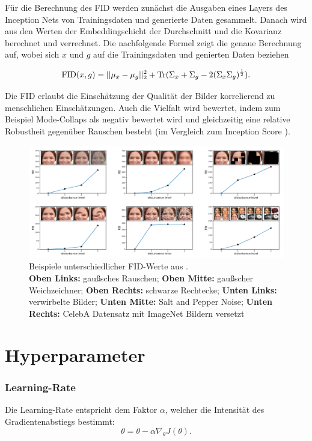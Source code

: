 Für die Berechnung des \acrshort{FID} werden zunächst die Ausgaben eines Layers des Inception Nets von Trainingsdaten und generierte Daten gesammelt.
Danach wird aus den Werten der Embeddingschicht der Durchschnitt und die Kovarianz berechnet und verrechnet.
Die nachfolgende Formel \cite{are-gans-created-equally} zeigt die genaue Berechnung auf, wobei sich $x$ und $g$ auf die Trainingsdaten und genierten Daten beziehen

\begin{equation}
	\operatorname{FID}(x, g) = ||\mu_x - \mu_g||_2^2 + \operatorname{Tr}(\Sigma_x + \Sigma_g - 2(\Sigma_x \Sigma_g)^{\frac{1}{2}}).
\end{equation}

Die \acrshort{FID} erlaubt die Einschätzung der Qualität der Bilder korrelierend zu menschlichen Einschätzungen.
Auch die Vielfalt wird bewertet, indem zum Beispiel Mode-Collaps als negativ bewertet wird und gleichzeitig eine relative Robustheit gegenüber Rauschen besteht (im Vergleich zum Inception Score \cite{are-gans-created-equally}). 

\begin{figure}[H]
	\centering
	\includegraphics[width=16cm]{kapitel/2_stand_der_technik/img/fid-example.png}
	\caption[Beispiel von unterschiedlichen FID-Werten]{Beispiele unterschiedlicher FID-Werte aus \cite{fid}.\\ \textbf{Oben Links:} gaußsches Rauschen; \textbf{Oben Mitte:} gaußscher Weichzeichner; \textbf{Oben Rechts:} schwarze Rechtecke; \textbf{Unten Links:} verwirbelte Bilder; \textbf{Unten Mitte:} Salt and Pepper Noise; \textbf{Unten Rechts:} CelebA Datensatz mit ImageNet Bildern versetzt }
	\label{fid-example}
\end{figure}

\section{Hyperparameter}
\subsubsection{Learning-Rate}
Die Learning-Rate entspricht dem Faktor \(\alpha\), welcher die Intensität des Gradientenabstiegs bestimmt:  
\begin{equation}
	\theta  =  \theta  - \alpha   \nabla_{ \theta }  J( \theta ).
\end{equation}

